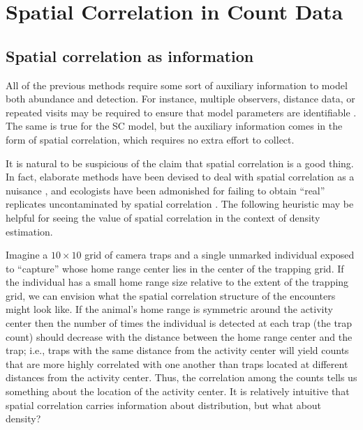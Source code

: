\section{Spatial Correlation in Count Data}

\subsection{Spatial correlation as information}
\label{sect.corr-info}

All of the previous methods require some sort of auxiliary information
to model both abundance and detection. For instance, %
multiple observers, distance data, or repeated visits
may be required to ensure
that model parameters are identifiable
\citep[but see][]{lele_etal:2012, solymos_etal:2012}. The same is true for
the SC model, but the auxiliary information comes in the form of spatial
correlation, which requires no extra effort to collect.

It is natural to be suspicious of the claim that spatial correlation
is a good thing. In fact, elaborate methods have been devised to deal
with spatial correlation as a nuisance %
\citep{lichstein_etal:2002,dormann_etal:2007}, and ecologists have been admonished for
failing to obtain ``real'' replicates uncontaminated by spatial
correlation \citep{hurlbert:1984}. The following heuristic may be
helpful for seeing the value of spatial correlation
in the context of density estimation.

Imagine a $10 \times 10$ grid of camera traps and a single unmarked
individual exposed to ``capture'' whose home range center lies in the center of the
trapping grid. If the individual has a small home range size relative
to the extent of the trapping grid, we can envision what the
spatial correlation structure of the encounters might look
like. If the animal's home range is symmetric around the activity center
then the number of times the individual is detected at each
trap (the trap count) should decrease with the distance between the home
range center and the trap; i.e., traps with the same distance
from the activity center will yield counts that are more highly
correlated with one another than traps located at different distances
from the activity center. Thus, the correlation among the counts tells us
something about the location of the activity center. It is relatively
intuitive that spatial correlation carries information about
distribution, but what about density?


